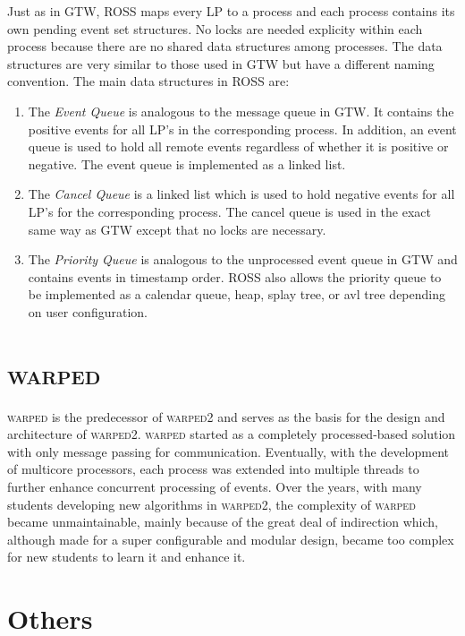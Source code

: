 \documentclass[11pt]{book}
\begin{document}
Just as in GTW, ROSS maps every LP to a process and each process contains its own pending
event set structures. No locks are needed explicity within each process because there are
no shared data structures among processes. The data structures are very similar to those
used in GTW but have a different naming convention. The main data structures in ROSS are:

\begin{enumerate}
    \item The \emph{Event Queue} is analogous to the message queue in GTW. It contains the
        positive events for all LP's in the corresponding process. In addition, an event
        queue is used to hold all remote events regardless of whether it is positive or
        negative. The event queue is implemented as a linked list.
    \item The \emph{Cancel Queue} is a linked list which is used to hold negative events
        for all LP's for the corresponding process. The cancel queue is used in the exact
        same way as GTW except that no locks are necessary.
    \item The \emph{Priority Queue} is analogous to the unprocessed event queue in GTW and
        contains events in timestamp order. ROSS also allows the priority queue to be
        implemented as a calendar queue, heap, splay tree, or avl tree depending on user
        configuration.
\end{enumerate}

\section{\textsc{warped}}

\textsc{warped} is the predecessor of \textsc{warped2} and serves as the basis for the design
and architecture of \textsc{warped2}. \textsc{warped} started as a completely processed-based
solution with only message passing for communication. Eventually, with the development of
multicore processors, each process was extended into multiple threads to further enhance
concurrent processing of events. Over the years, with many students developing new algorithms
in \textsc{warped2}, the complexity of \textsc{warped} became unmaintainable, mainly because
of the great deal of indirection which, although made for a super configurable and modular
design, became too complex for new students to learn it and enhance it.

\section{Others}
\end{document}
